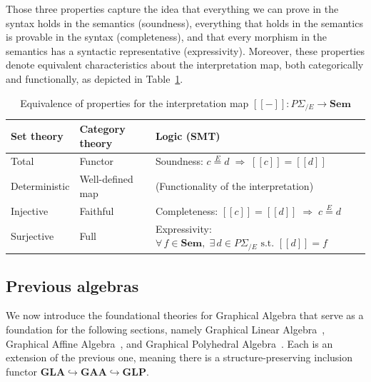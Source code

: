 Those three properties capture the idea that everything we can prove in the syntax holds in the semantics (soundness), everything that holds in the semantics is provable in the syntax (completeness), and that every morphism in the semantics has a syntactic representative (expressivity). Moreover, these properties denote equivalent characteristics about the interpretation map, both categorically and functionally, as depicted in Table~\ref{tab:equivalences}.

\begin{table}[h!]
	\centering
	\caption{Equivalence of properties for the interpretation map
	$[\![{-}]\!] : P\Sigma_{/E} \to \mathbf{Sem}$}
	\label{tab:equivalences}
	\begin{tabular}{
			m{3.2cm}
			m{3.2cm}
			m{4.5cm}
		}
		\toprule
		\textbf{Set theory}      &
		\textbf{Category theory} &
		\textbf{Logic (SMT)}                                                                                     \\
		\midrule
		Total                    &
		Functor                  &
		Soundness: $c \overset{E}{=} d \;\Rightarrow\; [\![c]\!] = [\![d]\!]$                                    \\[6pt]
		Deterministic            &
		Well-defined map         &
		(Functionality of the interpretation)                                                                    \\[6pt]
		Injective                &
		Faithful                 &
		Completeness: $[\![c]\!] = [\![d]\!] \;\Rightarrow\; c \overset{E}{=} d$                                 \\[6pt]
		Surjective               &
		Full                     &
		Expressivity: $\forall\, f \in \mathbf{Sem},\; \exists\, d \in P\Sigma_{/E} \text{ s.t. } [\![d]\!] = f$ \\
		\bottomrule
	\end{tabular}
\end{table}

\subsection{Previous algebras}

We now introduce the foundational theories for Graphical Algebra that serve as a foundation for the following sections, namely Graphical Linear Algebra~\cite{paixao2022highlevel, bonchi2017interacting}, Graphical Affine Algebra~\cite{bonchi2019affine}, and Graphical Polyhedral Algebra~\cite{bonchi2021polyhedral}. Each is an extension of the previous one, meaning there is a structure-preserving inclusion functor $\mathbf{GLA} \hookrightarrow \mathbf{GAA} \hookrightarrow \mathbf{GLP}$.

